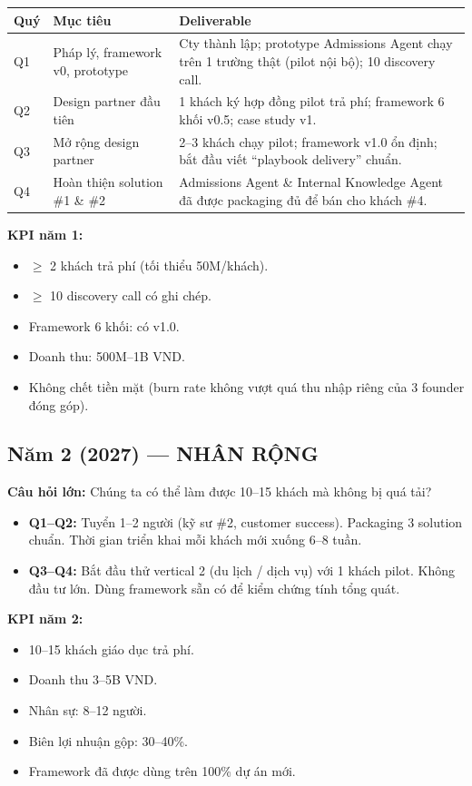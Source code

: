 \documentclass[11pt,a4paper]{article}
\begin{document}
\begin{tabularx}{\linewidth}{@{}p{1.2cm} X X@{}}
\toprule
\textbf{Quý} & \textbf{Mục tiêu} & \textbf{Deliverable} \\
\midrule
Q1 & Pháp lý, framework v0, prototype & Cty thành lập; prototype Admissions Agent chạy trên 1 trường thật (pilot nội bộ); 10 discovery call. \\
Q2 & Design partner đầu tiên & 1 khách ký hợp đồng pilot trả phí; framework 6 khối v0.5; case study v1. \\
Q3 & Mở rộng design partner & 2--3 khách chạy pilot; framework v1.0 ổn định; bắt đầu viết ``playbook delivery'' chuẩn. \\
Q4 & Hoàn thiện solution \#1 \& \#2 & Admissions Agent \& Internal Knowledge Agent đã được packaging đủ để bán cho khách \#4. \\
\bottomrule
\end{tabularx}

\textbf{KPI năm 1:}
\begin{itemize}
\item $\geq$ 2 khách trả phí (tối thiểu 50M/khách).
\item $\geq$ 10 discovery call có ghi chép.
\item Framework 6 khối: có v1.0.
\item Doanh thu: 500M--1B VND.
\item Không chết tiền mặt (burn rate không vượt quá thu nhập riêng của 3 founder đóng góp).
\end{itemize}

\subsection{Năm 2 (2027) — NHÂN RỘNG}

\textbf{Câu hỏi lớn:} Chúng ta có thể làm được 10--15 khách mà không bị quá tải?

\begin{itemize}
\item \textbf{Q1--Q2:} Tuyển 1--2 người (kỹ sư \#2, customer success). Packaging
3 solution chuẩn. Thời gian triển khai mỗi khách mới xuống 6--8 tuần.
\item \textbf{Q3--Q4:} Bắt đầu thử vertical 2 (du lịch / dịch vụ) với 1 khách pilot.
Không đầu tư lớn. Dùng framework sẵn có để kiểm chứng tính tổng quát.
\end{itemize}

\textbf{KPI năm 2:}
\begin{itemize}
\item 10--15 khách giáo dục trả phí.
\item Doanh thu 3--5B VND.
\item Nhân sự: 8--12 người.
\item Biên lợi nhuận gộp: 30--40\%.
\item Framework đã được dùng trên 100\% dự án mới.
\end{itemize}
\end{document}
